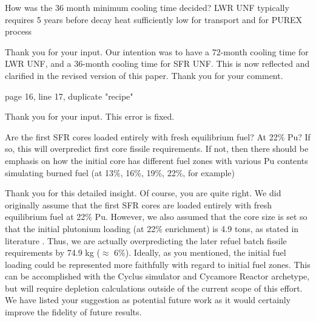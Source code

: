 \documentclass[answers,11pt]{exam}
\begin{document}
\begin{questions}
        \question How was the 36 month minimum cooling time decided? LWR UNF 
        typically requires 5 years before decay heat sufficiently low for 
        transport and for PUREX process

        \begin{solution}
                Thank you for your input. Our intention was to have a 72-month
                cooling time for LWR UNF, and a 36-month cooling time for SFR UNF.
                This is now reflected and clarified in the revised version of
                this paper. Thank you for your comment.
        \end{solution}

        \question page 16, line 17, duplicate "recipe"
        \begin{solution}
                Thank you for your input. This error is fixed.
        \end{solution}

        \question Are the first SFR cores loaded entirely with fresh 
        equilibrium fuel? At 22\% Pu?  If so, this will overpredict first core 
        fissile requirements. If not, then there should be emphasis on how the 
        initial core has different fuel zones with various Pu contents 
        simulating burned fuel (at 13\%, 16\%, 19\%, 22\%, for example)

        \begin{solution}
                Thank you for this detailed insight. Of course, you are quite right. 
                We did originally assume
                that the first SFR cores are loaded entirely with
                fresh equilibrium fuel at 22\% Pu. However, we also assumed
                that the core size is set so that the initial plutonium
                loading (at 22\% enrichment) is 4.9 tons, as stated in
                literature \cite{chenaud_status_2013}. Thus, we are
                actually overpredicting the later refuel batch fissile
                requirements by 74.9 kg ($\approx$ 6\%). 
                Ideally, as you mentioned, the initial fuel loading
                could be represented more faithfully with regard to initial
                fuel zones.
                This can be accomplished with the Cyclus simulator 
                and Cycamore Reactor archetype, but will require depletion 
                calculations outside of the current scope of this effort. We 
                have listed your suggestion as potential future work as it 
                would certainly improve the fidelity of future results.     
        \end{solution}



\end{questions}
\end{document}
